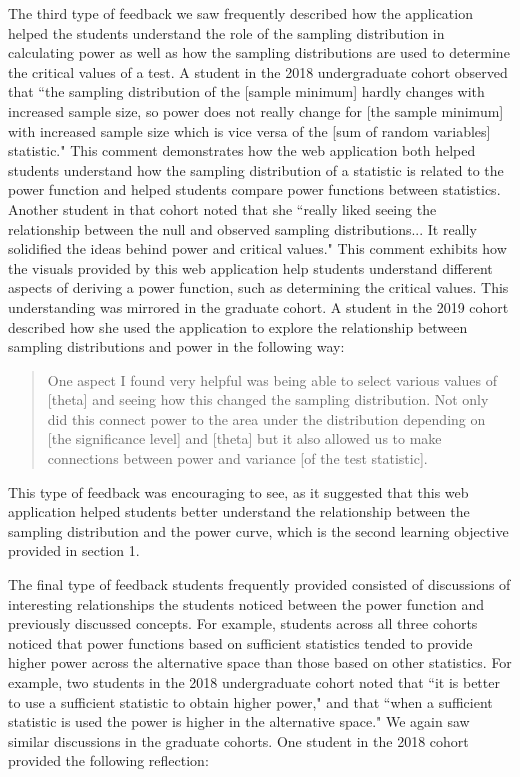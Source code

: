 \documentclass{TISE}
\begin{document}
The third type of feedback we saw frequently described how the application helped the students understand the role of the sampling distribution in calculating power as well as how the sampling distributions are used to determine the critical values of a test. 
A student in the 2018 undergraduate cohort observed that ``the sampling distribution of the [sample minimum] hardly changes with increased sample size, so power does not really change for [the sample minimum] with increased sample size which is vice versa of the [sum of random variables] statistic." This comment demonstrates how the web application both helped students understand how the sampling distribution of a statistic is related to the power function and helped students compare power functions between statistics. Another student in that cohort noted that she ``really liked seeing the relationship between the null and observed sampling distributions... It really solidified the ideas behind power and critical values." This comment exhibits how the visuals provided by this web application help students understand different aspects of deriving a power function, such as determining the critical values. This understanding was mirrored in the graduate cohort. A student in the 2019 cohort described how she used the application to explore the relationship between sampling distributions and power in the following way:

\begin{quote}
	One aspect I found very helpful was being able to select various values of [theta] and seeing how this changed the sampling distribution. Not only did this connect power to the area under the distribution depending on [the significance level] and [theta] but it also allowed us to make connections between power and variance [of the test statistic]. 
\end{quote}

This type of feedback was encouraging to see, as it suggested that this web application helped students better understand the relationship between the sampling distribution and the power curve, which is the second learning objective provided in section 1. 

The final type of feedback students frequently provided consisted of discussions of interesting relationships the students noticed between the power function and previously discussed concepts. For example, students across all three cohorts noticed that power functions based on sufficient statistics tended to provide higher power across the alternative space than those based on other statistics. For example, two students in the 2018 undergraduate cohort noted that ``it is better to use a sufficient statistic to obtain higher power," and that ``when a sufficient statistic is used the power is higher in the alternative space." We again saw similar discussions in the graduate cohorts. One student in the 2018 cohort provided the following reflection:
\end{document}
